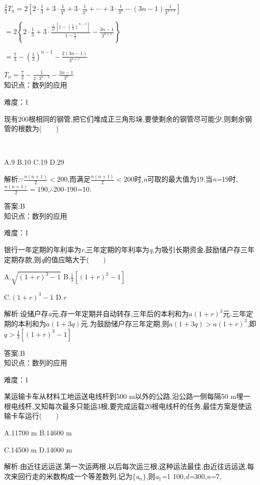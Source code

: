 \documentclass{article} %
\begin{document}
$\frac{2}{3}T_n=2[2\cdot \frac{1}{3}+3\cdot \frac{1}{3^2}+3\cdot \frac{1}{3^3}+\cdots +3\cdot \frac{1}{3^n}-(3n-1)\frac{1}{3^{n+1}}]$

$=2\left\{2\cdot \frac{1}{3}+3\cdot \frac{\frac{1}{3^2}[1-(\frac{1}{3})^{n-1}]}{1-\frac{1}{3}}-\frac{3n-1}{3^{n+1}}\right\}$

$=\frac{7}{3}-(\frac{1}{3})^{n-1}-\frac{2(3n-1)}{3^{n+1}}$

$T_n=\frac{7}{2}-\frac{1}{2\cdot 3^{n-2}}-\frac{3n-1}{3^n}$ \\


知识点：数列的应用

难度：1

 现有200根相同的钢管,把它们堆成正三角形垛,要使剩余的钢管尽可能少,则剩余钢管的根数为(\textit{　　})

 \textit{　　　　　　　　　　　　　　　　}

A.9 B.10 C.19 D.29

 解析:$\because \frac{n(n+1)}{2}<200$,而满足$\frac{n(n+1)}{2}<200$时,\textit{n}可取的最大值为19\textit{.}当\textit{n=}19时,$\frac{n(n+1)}{2}=190$,\textit{$\therefore$}200\textit{-}190\textit{=}10\textit{.}

 答案:B \\

知识点：数列的应用

难度：1

 银行一年定期的年利率为\textit{r},三年定期的年利率为\textit{q},为吸引长期资金,鼓励储户存三年定期存款,则\textit{q}的值应略大于(\textit{　　})

 A.$\sqrt{(1+r)^3-1}$ B.$\frac{1}{3}[(1+r)^3-1]$

 C.$(1+r)^3-1$ D.\textit{r}

 解析:设储户存\textit{a}元,存一年定期并自动转存,三年后的本利和为$a(1+r)^3$元\textit{.}三年定期的本利和为$a(1+3q)$元\textit{.}为鼓励储户存三年定期,则$a(1+3q)>a(1+r)^3$,即$q>\frac{1}{3}[(1+r)^3-1]$

 答案:B \\

知识点：数列的应用

难度：1

 某运输卡车从材料工地运送电线杆到500 m以外的公路,沿公路一侧每隔50 m埋一根电线杆,又知每次最多只能运3根,要完成运载20根电线杆的任务,最佳方案是使运输卡车运行(\textit{　　})

 A.11700 m B.14600 m

 C.14500 m D.14000 m

 解析:由近往远运送,第一次运两根,以后每次运三根,这种运法最佳,由近往远运送,每次来回行走的米数构成一个等差数列,记为$\mathrm{\{}$\textit{a${}_{n}$}$\mathrm{\}}$,则\textit{a}${}_{1}$\textit{=}1 100,\textit{d=}300,\textit{n=}7,
\end{document}
